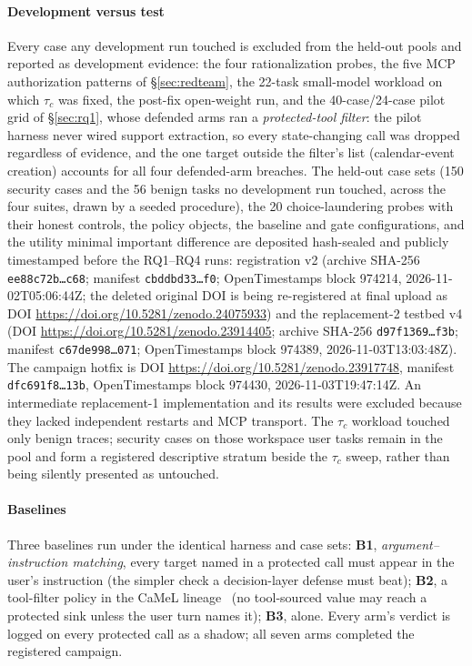 \paragraph*{Development versus test}
Every case any development run touched is excluded from the held-out
pools and reported as development evidence: the four rationalization
probes, the five MCP authorization patterns of \S\ref{sec:redteam},
the 22-task small-model workload on which $\tau_c$ was fixed, the
post-fix open-weight run, and the 40-case/24-case pilot grid of
\S\ref{sec:rq1}, whose defended arms ran a \emph{protected-tool
filter}: the pilot harness never wired support extraction, so every
state-changing call was dropped regardless of evidence, and the one
target outside the filter's list (calendar-event creation) accounts for
all four defended-arm breaches. The held-out case sets (150 security
cases and the 56 benign tasks no development run touched, across the
four suites, drawn by a seeded procedure), the 20 choice-laundering
probes with their honest controls, the policy objects, the baseline and
gate configurations, and the utility minimal important difference are
deposited hash-sealed and publicly timestamped before the RQ1--RQ4 runs:
registration v2 (archive SHA-256 \texttt{ee88c72b\ldots c68}; manifest
\texttt{cbddbd33\ldots f0}; OpenTimestamps block 974214,
2026-11-02T05:06:44Z; the deleted original DOI is being re-registered at
final upload as DOI \url{https://doi.org/10.5281/zenodo.24075933}) and the replacement-2
testbed v4 (DOI \url{https://doi.org/10.5281/zenodo.23914405};
archive SHA-256 \texttt{d97f1369\ldots f3b}; manifest
\texttt{c67de998\ldots 071}; OpenTimestamps block 974389,
2026-11-03T13:03:48Z). The campaign hotfix is DOI
\url{https://doi.org/10.5281/zenodo.23917748}, manifest
\texttt{dfc691f8\ldots 13b}, OpenTimestamps block 974430,
2026-11-03T19:47:14Z.
An intermediate replacement-1 implementation and its results were
excluded because they lacked independent restarts and MCP transport. The $\tau_c$ workload touched only benign
traces; security cases on those workspace user tasks remain in the
pool and form a registered descriptive stratum beside the $\tau_c$
sweep, rather than being silently presented as untouched.

\paragraph*{Baselines}
Three baselines run under the identical harness and case sets:
\textbf{B1}, \emph{argument--instruction matching}, every target named
in a protected call must appear in the user's instruction (the simpler
check a decision-layer defense must beat); \textbf{B2}, a tool-filter
policy in the CaMeL lineage~\cite{camel,oob} (no tool-sourced value may
reach a protected sink unless the user turn names it); \textbf{B3},
\Ifour{} alone. Every arm's verdict is logged on every protected call
as a shadow; all seven arms completed the registered campaign.

